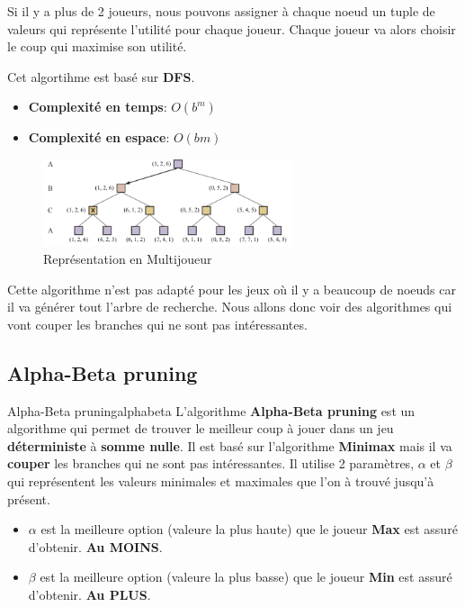 Si il y a plus de 2 joueurs, nous pouvons assigner à chaque noeud un tuple de valeurs qui représente l'utilité pour chaque joueur. 
Chaque joueur va alors choisir le coup qui maximise son utilité. 

\begin{remark}\leavevmode
    Cet algortihme est basé sur \textbf{DFS}. 
    \begin{itemize}
        \item \textbf{Complexité en temps}: $O(b^m)$
        \item \textbf{Complexité en espace}: $O(bm)$
    \end{itemize}
\end{remark}

\begin{figure}
    \begin{center}
        \includegraphics[width=0.65\textwidth]{./pictures/multiminimax.png}
    \end{center}
    \caption{Représentation en Multijoueur}\label{fig:mutliminimax}
\end{figure}

Cette algorithme n'est pas adapté pour les jeux où il y a beaucoup de noeuds car il va générer tout l'arbre de recherche. 
Nous allons donc voir des algorithmes qui vont couper les branches qui ne sont pas intéressantes.

\subsection{Alpha-Beta pruning} %
\label{sub:alpha_beta_pruning}

\begin{definition}{Alpha-Beta pruning}{alphabeta}
    L'algorithme \textbf{Alpha-Beta pruning} est un algorithme qui permet de trouver le meilleur coup à jouer dans un jeu \textbf{déterministe} à \textbf{somme nulle}.
    Il est basé sur l'algorithme \textbf{Minimax} mais il va \textbf{couper} les branches qui ne sont pas intéressantes.
    Il utilise 2 paramètres, $\alpha$ et $\beta$ qui représentent les valeurs minimales et maximales que l'on à trouvé jusqu'à présent.
    \begin{itemize}
        \item $\alpha$ est la meilleure option (valeure la plus haute) que le joueur \textbf{Max} est assuré d'obtenir. 
            \textbf{Au MOINS}.
        \item $\beta$ est la meilleure option (valeure la plus basse) que le joueur \textbf{Min} est assuré d'obtenir. 
            \textbf{Au PLUS}.
    \end{itemize} 
\end{definition}

